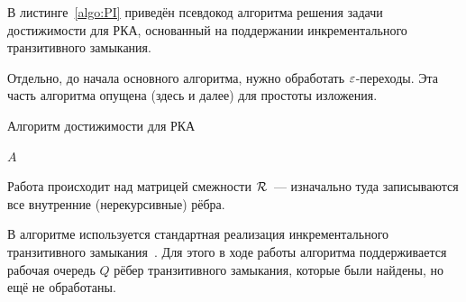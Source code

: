 В листинге~\ref{algo:PI} приведён псевдокод алгоритма решения задачи достижимости для РКА, основанный на поддержании инкрементального транзитивного замыкания.

\begin{note}
  Отдельно, до начала основного алгоритма, нужно обработать $\varepsilon$-переходы. Эта часть алгоритма опущена (здесь и далее) для простоты изложения. 
\end{note}

\begin{algorithm}[h]
    \begin{algorithmic}[1]
    \caption{Алгоритм достижимости для РКА}
    \label{algo:PI}
            \EndFor
        \EndFor
            \EndIf
                        \EndIf
                    \EndFor
                \EndIf
            \EndFor
        \EndWhile
    \State \Return $A$
    \EndFunction
    \end{algorithmic}
\end{algorithm}

Работа происходит над матрицей смежности $\mathcal{R}$~--- изначально туда записываются все внутренние (нерекурсивные) рёбра. 

В алгоритме используется стандартная реализация инкрементального транзитивного замыкания~\cite{Ibaraki1983}. Для этого в ходе работы алгоритма поддерживается рабочая очередь $Q$ рёбер транзитивного замыкания, которые были найдены, но ещё не обработаны. 

\pagebreak

